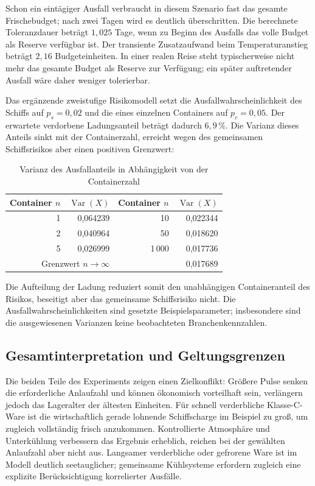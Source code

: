 \documentclass[a4paper, 12pt, twoside, openright]{report}
\theoremstyle{definition}
\theoremstyle{definition}
\begin{document}
Schon ein eintägiger Ausfall verbraucht in diesem Szenario fast das gesamte
Frischebudget; nach zwei Tagen wird es deutlich überschritten. Die berechnete
Toleranzdauer beträgt $1{,}025$ Tage, wenn zu Beginn des Ausfalls das volle
Budget als Reserve verfügbar ist. Der transiente Zusatzaufwand beim
Temperaturanstieg beträgt $2{,}16$ Budgeteinheiten. In einer realen Reise
steht typischerweise nicht mehr das gesamte Budget als Reserve zur Verfügung;
ein später auftretender Ausfall wäre daher weniger tolerierbar.

Das ergänzende zweistufige Risikomodell setzt die Ausfallwahrscheinlichkeit
des Schiffs auf $p_s=0{,}02$ und die eines einzelnen Containers auf
$p_c=0{,}05$. Der erwartete verdorbene Ladungsanteil beträgt dadurch
$6{,}9\,\%$. Die Varianz dieses Anteils sinkt mit der Containerzahl, erreicht
wegen des gemeinsamen Schiffsrisikos aber einen positiven Grenzwert:

\begin{table}[htbp]
  \centering
  \caption{Varianz des Ausfallanteils in Abhängigkeit von der Containerzahl}
  \label{tab:experiment-seefracht-risiko}
  \begin{tabular}{rr|rr}
    \toprule
    Container $n$ & $\operatorname{Var}(X)$ & Container $n$ & $\operatorname{Var}(X)$ \\
    \midrule
    1 & 0{,}064239 & 10 & 0{,}022344 \\
    2 & 0{,}040964 & 50 & 0{,}018620 \\
    5 & 0{,}026999 & 1\,000 & 0{,}017736 \\
    \multicolumn{2}{r|}{Grenzwert $n\to\infty$} &
      \multicolumn{2}{r}{0{,}017689} \\
    \bottomrule
  \end{tabular}
\end{table}

Die Aufteilung der Ladung reduziert somit den unabhängigen Containeranteil
des Risikos, beseitigt aber das gemeinsame Schiffsrisiko nicht. Die
Ausfallwahrscheinlichkeiten sind gesetzte Beispielsparameter; insbesondere
sind die ausgewiesenen Varianzen keine beobachteten Branchenkennzahlen.

\subsection{Gesamtinterpretation und Geltungsgrenzen}

Die beiden Teile des Experiments zeigen einen Zielkonflikt: Größere Pulse
senken die erforderliche Anlaufzahl und können ökonomisch vorteilhaft sein,
verlängern jedoch das Lageralter der ältesten Einheiten. Für schnell
verderbliche Klasse-C-Ware ist die wirtschaftlich gerade lohnende
Schiffscharge im Beispiel zu groß, um zugleich vollständig frisch anzukommen.
Kontrollierte Atmosphäre und Unterkühlung verbessern das Ergebnis erheblich,
reichen bei der gewählten Anlaufzahl aber nicht aus. Langsamer verderbliche
oder gefrorene Ware ist im Modell deutlich seetauglicher; gemeinsame
Kühlsysteme erfordern zugleich eine explizite Berücksichtigung korrelierter
Ausfälle.
\end{document}
